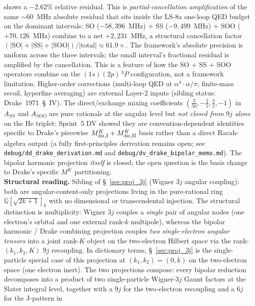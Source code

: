 \documentclass[11pt]{article}
\begin{document}
shows a $-2.62\%$ relative residual.  This is \emph{partial-cancellation
amplification} of the same $\sim$$60$~MHz absolute residual that sits
inside the LS-8a one-loop QED budget on the dominant intervals: SO
($-58{,}396$~MHz) $+$ SS ($-9{,}499$~MHz) $+$ SOO ($+70{,}126$~MHz)
combine to a net $+2{,}231$~MHz, a structural cancellation factor
$(|\text{SO}|+|\text{SS}|+|\text{SOO}|) / |\text{total}| \approx 61.9\times$.
The framework's absolute precision is uniform across the three
intervals; the small interval's fractional residual is amplified by
the cancellation.  This is a feature of how the SO + SS + SOO
operators combine on the $(1s)(2p)\,{}^3\!P$ configuration, not a
framework limitation.  Higher-order corrections (multi-loop QED at
$\alpha^4 \cdot \alpha/\pi$, finite-mass recoil, hyperfine averaging)
are external Layer-2 inputs (sibling status: Drake~1971~\S~IV).
The direct/exchange mixing coefficients
$(\tfrac{3}{50}, -\tfrac{2}{5}, \tfrac{3}{2}, -1)$ in
$A_{SS}$ and $A_{SOO}$ are pure rationals at the angular level but
\emph{not closed from $9j$ alone} on the He triplet: Sprint~5 DV
showed they are convention-dependent identities specific to Drake's
piecewise $M^K_{\rm dir,I} + M^K_{\rm dir,II}$ basis rather than a
direct Racah-algebra output (a fully first-principles derivation
remains open; see \texttt{debug/dd\_drake\_derivation.md} and
\texttt{debug/dv\_drake\_bipolar\_memo.md}).  The bipolar harmonic
projection \emph{itself} is closed; the open question is the basis
change to Drake's specific $M^K$ partitioning.\\
\textbf{Structural reading.}  Sibling of \S~\ref{sec:proj_3j}
(Wigner $3j$ angular coupling): both are angular-content-only
projections living in the pure-rational ring
$\mathbb{Q}[\sqrt{2k+1}]_{k}$ with no dimensional or transcendental
injection.  The structural distinction is multiplicity: Wigner $3j$
couples a \emph{single} pair of angular nodes (one electron's
orbital and one external rank-$k$ multipole), whereas the bipolar
harmonic / Drake combining projection couples \emph{two
single-electron angular tensors} into a joint rank-$K$ object on
the two-electron Hilbert space via the rank-$(k_1, k_2, K)$
$9j$ recoupling.  In dictionary terms, \S~\ref{sec:proj_3j} is
the single-particle special case of this projection at
$(k_1, k_2) = (0, k)$ on the two-electron space (one electron
inert).  The two projections compose: every bipolar reduction
decomposes into a product of two single-particle Wigner-$3j$ Gaunt
factors at the Slater integral level, together with a $9j$ for the
two-electron recoupling and a $6j$ for the J-pattern in
$$
\end{document}
